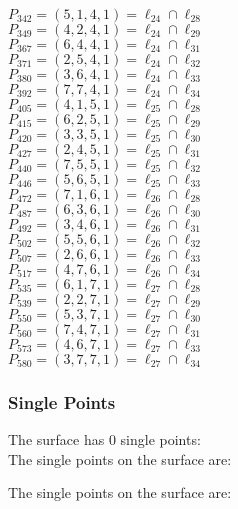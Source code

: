 \documentclass{article}
\begin{document}
{\begin{multicols}{2}
$P_{342} = ( 5, 1, 4, 1 ) = \ell_{24} \cap \ell_{28} $\\
$P_{349} = ( 4, 2, 4, 1 ) = \ell_{24} \cap \ell_{29} $\\
$P_{367} = ( 6, 4, 4, 1 ) = \ell_{24} \cap \ell_{31} $\\
$P_{371} = ( 2, 5, 4, 1 ) = \ell_{24} \cap \ell_{32} $\\
$P_{380} = ( 3, 6, 4, 1 ) = \ell_{24} \cap \ell_{33} $\\
$P_{392} = ( 7, 7, 4, 1 ) = \ell_{24} \cap \ell_{34} $\\
$P_{405} = ( 4, 1, 5, 1 ) = \ell_{25} \cap \ell_{28} $\\
$P_{415} = ( 6, 2, 5, 1 ) = \ell_{25} \cap \ell_{29} $\\
$P_{420} = ( 3, 3, 5, 1 ) = \ell_{25} \cap \ell_{30} $\\
$P_{427} = ( 2, 4, 5, 1 ) = \ell_{25} \cap \ell_{31} $\\
$P_{440} = ( 7, 5, 5, 1 ) = \ell_{25} \cap \ell_{32} $\\
$P_{446} = ( 5, 6, 5, 1 ) = \ell_{25} \cap \ell_{33} $\\
$P_{472} = ( 7, 1, 6, 1 ) = \ell_{26} \cap \ell_{28} $\\
$P_{487} = ( 6, 3, 6, 1 ) = \ell_{26} \cap \ell_{30} $\\
$P_{492} = ( 3, 4, 6, 1 ) = \ell_{26} \cap \ell_{31} $\\
$P_{502} = ( 5, 5, 6, 1 ) = \ell_{26} \cap \ell_{32} $\\
$P_{507} = ( 2, 6, 6, 1 ) = \ell_{26} \cap \ell_{33} $\\
$P_{517} = ( 4, 7, 6, 1 ) = \ell_{26} \cap \ell_{34} $\\
$P_{535} = ( 6, 1, 7, 1 ) = \ell_{27} \cap \ell_{28} $\\
$P_{539} = ( 2, 2, 7, 1 ) = \ell_{27} \cap \ell_{29} $\\
$P_{550} = ( 5, 3, 7, 1 ) = \ell_{27} \cap \ell_{30} $\\
$P_{560} = ( 7, 4, 7, 1 ) = \ell_{27} \cap \ell_{31} $\\
$P_{573} = ( 4, 6, 7, 1 ) = \ell_{27} \cap \ell_{33} $\\
$P_{580} = ( 3, 7, 7, 1 ) = \ell_{27} \cap \ell_{34} $\\
\end{multicols}
\subsubsection*{Single Points}
The surface has 0 single points:\\
The single points on the surface are:\\
\begin{multicols}{2}
\noindent
\end{multicols}
The single points on the surface are:\\
}
\end{document}

